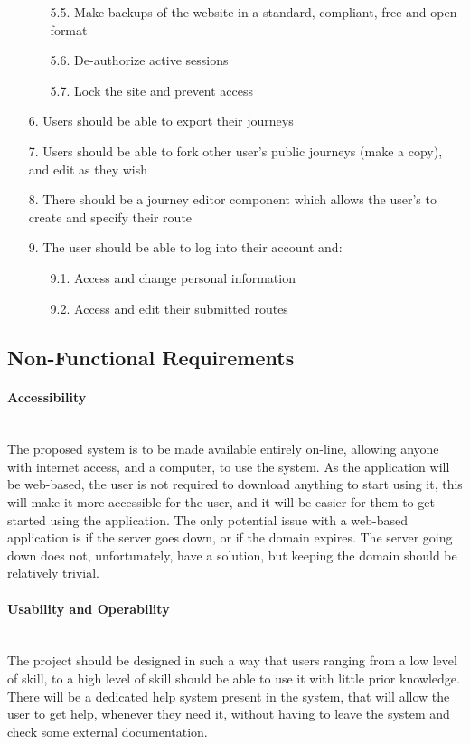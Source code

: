 \documentclass[a4paper,twoside,notitlepage,11pt]{article}
\begin{document}
\begin{enumerate}
\begin{enumerate}
 		\item[5.5.] Make backups of the website in a standard, compliant, free and open format
 		\item[5.6.] De-authorize active sessions
 		\item[5.7.] Lock the site and prevent access
 	\end{enumerate}
 \item[6.] Users should be able to export their journeys
 \item[7.] Users should be able to fork other user's public journeys (make a copy), and edit as they wish
 \item[8.] There should be a journey editor component which allows the user's to create and specify their route
 \item[9.] The user should be able to log into their account and:
	 \begin{enumerate}
	 	\item[9.1.] Access and change personal information
	  	\item[9.2.] Access and edit their submitted routes
	 \end{enumerate}
 
 \end{enumerate}
 
 
 \subsection{Non-Functional Requirements}

\paragraph{Accessibility}\ \\
The proposed system is to be made available entirely on-line, allowing anyone with internet access, and a computer, to use the system. As the application will be web-based, the user is not required to download anything to start using it, this will make it more accessible for the user, and it will be easier for them to get started using the application. The only potential issue with a web-based application is if the server goes down, or if the domain expires. The server going down does not, unfortunately, have a solution, but keeping the domain should be relatively trivial.

\paragraph{Usability and Operability}\ \\
The project should be designed in such a way that users ranging from a low level of skill, to a high level of skill should be able to use it with little prior knowledge. There will be a dedicated help system present in the system, that will allow the user to get help, whenever they need it, without having to leave the system and check some external documentation.
\end{document}
